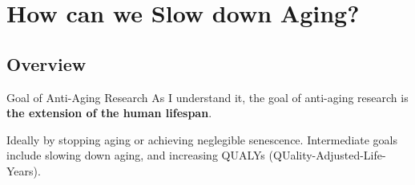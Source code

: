 \section{How can we Slow down Aging?}

\subsection{Overview}

\begin{frame}[c]{Goal of Anti-Aging Research}
    \large
    As I understand it, the goal of anti-aging research is \textbf{the extension of the human lifespan}.

    Ideally by stopping aging or achieving neglegible senescence.
    Intermediate goals include slowing down aging, and increasing QUALYs
    (QUality-Adjusted-Life-Years).
\end{frame}

